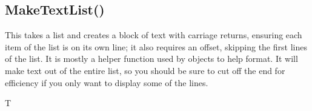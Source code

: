 \documentclass[letterpaper,10pt,english]{sphinxmanual}
\begin{document}
\sphinxAtStartPar
{}

\sphinxAtStartPar
{}

\ignorespaces 

\subsection{MakeTextList()}
\label{\detokenize{reference/ui:maketextlist}}\label{\detokenize{reference/ui:index-20}}
\sphinxAtStartPar
{}

\sphinxAtStartPar
{}

\sphinxAtStartPar
This takes a list and creates a block of text with carriage returns, ensuring each item of the list is on its own line; it also requires an offset, skipping the first lines of the list.  It is mostly a helper function used by  objects to help format.  It will make text out of the entire list, so  you should be sure to cut off the end for efficiency if you only want to display some of the lines.

\sphinxAtStartPar
{}

\begin{sphinxVerbatim}[commandchars=\\\{\}]
\end{sphinxVerbatim}

\sphinxAtStartPar
{}

\begin{sphinxVerbatim}[commandchars=\\\{\}]

T

\end{sphinxVerbatim}
\end{document}
